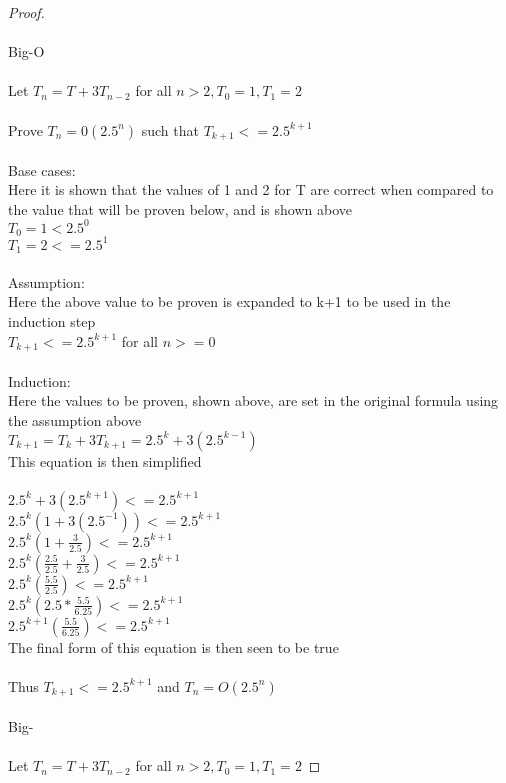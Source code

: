 \documentclass{article}
\begin{document}
\begin{solution}
\Large
\begin{proof}
\\\\Big-O
\\\\Let $T_n=T+3T_{n-2}$ for all $n>2, T_0=1, T_1=2$
\\\\Prove $T_n=0(2.5^n)$ such that $T_{k+1}<=2.5^{k+1}$
\\\\Base cases:
\\Here it is shown that the values of 1 and 2 for T are correct when compared to the value that will be proven below, and is shown above
\\$T_0=1<2.5^0$
\\$T_1=2<=2.5^1$
\\\\Assumption:
\\Here the above value to be proven is expanded to k+1 to be used in the induction step
\\$T_{k+1}<=2.5^{k+1}$ for all $n>=0$
\\\\Induction:
\\Here the values to be proven, shown above, are set in the original formula using the assumption above
\\$T_{k+1}=T_k+3T_{k+1}=2.5^k+3(2.5^{k-1})$
\endline
\\This equation is then simplified
\\\\$2.5^k+3(2.5^{k+1}) <= 2.5^{k+1}$
\\$2.5^k(1 + 3(2.5^{-1})) <= 2.5^{k+1}$
\\$2.5^k(1 + \frac{3}{2.5}) <= 2.5^{k+1}$
\\$2.5^k(\frac{2.5}{2.5} + \frac{3}{2.5}) <= 2.5^{k+1}$
\\$2.5^k(\frac{5.5}{2.5}) <= 2.5^{k+1}$
\\$2.5^k(2.5*\frac{5.5}{6.25}) <= 2.5^{k+1}$
\\$2.5^{k+1}(\frac{5.5}{6.25}) <= 2.5^{k+1}$
\endline
\\The final form of this equation is then seen to be true
\\\\Thus $T_{k+1} <= 2.5^{k+1}$ and $T_n = O(2.5^n)$
\\\\Big-\Omega
\\\\Let $T_n=T+3T_{n-2}$ for all $n>2, T_0=1, T_1=2$

\end{proof}
\end{solution}
\end{document}
